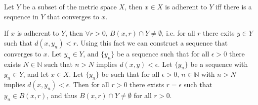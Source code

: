 \documentclass[nobib,notoc]{tufte-handout}
\begin{document}
\begin{thm}
	Let \(Y\) be a subset of the metric space \(X\), then \(x\in X\) is adherent to \(Y\) iff there is a sequence in \(Y\) that converges to \(x\).
	\begin{IEEEproof}
		If \(x\) is adherent to \(Y\), then \(\forall r>0\), \(B(x,r)\cap Y\neq\emptyset\), i.e. for all \(r\) there exits \(y\in Y\) such that \(d(x,y_n)<r\). Using this fact we can construct a sequence that converges to \(x\). Let \(y_n\in Y\), and \(\{y_n\}\) be a sequence such that for all \(\epsilon>0\) there exists \(N\in\mathbb{N}\) such that \(n>N\) implies \(d(x,y)<\epsilon\).\bigbreak
		Let \(\{y_n\}\) be a sequence with \(y_n\in Y\), and let \(x\in X\). Let \(\{y_n\}\) be such that for all \(\epsilon>0\), \(n\in\mathbb{N}\) with \(n>N\) implies \(d(x,y_n)<\epsilon\). Then for all \(r>0\) there exists \(r=\epsilon\) such that \(y_n\in B(x,r)\), and thus \(B(x,r)\cap Y\neq\emptyset\) for all \(r>0\).
	\end{IEEEproof}
\end{thm}
\end{document}
